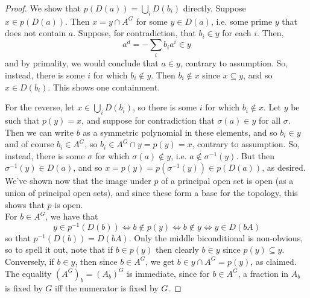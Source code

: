 \begin{proof}
	We show that $p(D(a)) = \bigcup_i D(b_i)$ directly. Suppose $x \in p(D(a))$. Then $x = y \cap A^G$ for some $y \in D(a)$, i.e. some prime $y$ that does not contain $a$. Suppose, for contradiction, that $b_i \in y$ for each $i$. Then,
	\[ a^d = -\sum_i b_ia^i \in y \]
	and by primality, we would conclude that $a \in y$, contrary to assumption. So, instead, there is some $i$ for which $b_i \notin y$. Then $b_i \notin x$ since $x \subseteq y$, and so $x \in D(b_i)$. This shows one containment.
	
	For the reverse, let $x \in \bigcup_i D(b_i)$, so there is some $i$ for which $b_i \notin x$. Let $y$ be such that $p(y) = x$, and suppose for contradiction that $\sigma(a) \in y$ for all $\sigma$. Then we can write $b$ as a symmetric polynomial in these elements, and so $b_i \in y$ and of course $b_i \in A^G$, so $b_i \in A^G \cap y = p(y) = x$, contrary to assumption. So, instead, there is some $\sigma$ for which $\sigma(a) \notin y$, i.e. $a \notin \sigma^{-1}(y)$. But then $\sigma^{-1}(y) \in D(a)$, and so $x = p(y) = p(\sigma^{-1}(y)) \in p(D(a))$, as desired. We've shown now that the image under $p$ of a principal open set is open (as a union of principal open sets), and since these form a base for the topology, this shows that $p$ is open. \\
	
	For $b \in A^G$, we have that
	\[ y \in p^{-1}(D(b)) \iff b \notin p(y) \iff b \notin y \iff y \in D(bA) \]
	so that $p^{-1}(D(b)) = D(bA)$. Only the middle biconditional is non-obvious, so to spell it out, note that if $b \in p(y)$ then clearly $b \in y$ since $p(y) \subseteq y$. Conversely, if $b \in y$, then since $b \in A^G$, we get $b \in y \cap A^G = p(y)$, as claimed. The equality $(A^G)_b = (A_b)^G$ is immediate, since for $b \in A^G$, a fraction in $A_b$ is fixed by $G$ iff the numerator is fixed by $G$. 
\end{proof}
